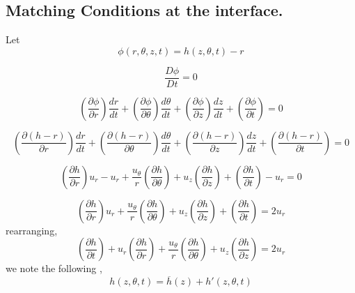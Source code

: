 \documentclass{article}
\begin{document}
\subsection{Matching Conditions at the interface.}
Let
\begin{equation}
\phi(r,\theta,z,t)=h(z,\theta,t)-r
\end{equation}

\begin{equation}
\frac{D\phi}{Dt}=0
\end{equation}

\begin{equation}
\left(\frac{\partial\phi}{\partial r}\right)\frac{dr}{dt}+\left(\frac{\partial\phi}{\partial\theta}\right)\frac{d\theta}{dt}+\left(\frac{\partial\phi}{\partial z}\right)\frac{dz}{dt}+\left(\frac{\partial\phi}{\partial t}\right)=0
\end{equation}

\begin{equation}
\left(\frac{\partial(h-r)}{\partial r}\right)\frac{dr}{dt}+\left(\frac{\partial(h-r)}{\partial\theta}\right)\frac{d\theta}{dt}+\left(\frac{\partial(h-r)}{\partial z}\right)\frac{dz}{dt}+\left(\frac{\partial(h-r)}{\partial t}\right)=0
\end{equation}

\begin{equation}
\left(\frac{\partial h}{\partial r}\right)u_{r}-u_{r}+\frac{u_{\theta}}{r}\left(\frac{\partial h}{\partial\theta}\right)+u_{z}\left(\frac{\partial h}{\partial z}\right)+\left(\frac{\partial h}{\partial t}\right)-u_{r}=0
\end{equation}

\begin{equation}
\left(\frac{\partial h}{\partial r}\right)u_{r}+\frac{u_{\theta}}{r}\left(\frac{\partial h}{\partial\theta}\right)+u_{z}\left(\frac{\partial h}{\partial z}\right)+\left(\frac{\partial h}{\partial t}\right)=2u_{r}
\end{equation}
rearranging,
\begin{equation}
\left(\frac{\partial h}{\partial t}\right)+u_{r}\left(\frac{\partial h}{\partial r}\right)+\frac{u_{\theta}}{r}\left(\frac{\partial h}{\partial\theta}\right)+u_{z}\left(\frac{\partial h}{\partial z}\right)=2u_{r}
\end{equation}
we note the following ,
\begin{equation}
h(z,\theta,t)=\overline{h}(z)+h'(z,\theta,t)
\end{equation}
\end{document}
